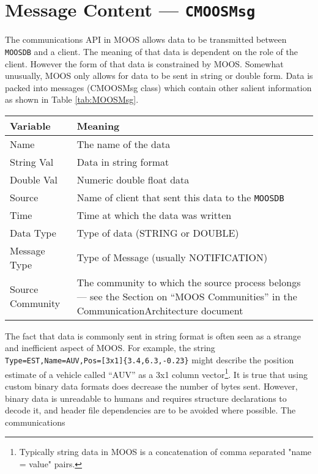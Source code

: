 \documentclass[a4paper,10pt]{article}
\newcommand{\Code}[1]{\texttt{#1} }
\newcommand{\code}[1]{\Code{#1} }
\newcommand{\DB}   {\code{{MOOSDB}}}
\begin{document}
\section{Message Content --- \code{CMOOSMsg} } \label{Sec:CMOOSMsg}
The communications API in MOOS allows data to be transmitted
between \DB and a client. The meaning of that data is dependent on
the role of the client. However the form of that data is
constrained by MOOS. Somewhat unusually, MOOS only allows for data
to be sent in string or double form. Data is packed into messages
(CMOOSMsg class) which contain other salient information as shown in
Table \ref{tab:MOOSMsg}.
\begin{table*}
\centering
\begin{tabular}{l|l}\hline
  {\textbf{Variable}} & {\textbf{Meaning}} \\ \hline
  Name  & The name of the data \\
  String Val & Data in string format \\
  Double Val & Numeric double float data \\
  Source & Name of client that sent this data to the \DB \\
  Time & Time at which the data was written \\
  Data Type & Type of data (STRING or DOUBLE)  \\
  Message Type & Type of Message (usually NOTIFICATION) \\
  Source Community & The community to which the source process
belongs --- see the Section on ``MOOS Communities'' in the CommunicationArchitecture document\\\hline
\end{tabular}\vspace{7mm}
  \caption{Contents of MOOS Message}\label{tab:MOOSMsg}
\end{table*}
The fact that data is commonly sent in string format is often seen
as a strange and inefficient aspect of MOOS. For example, the
string \verb"Type=EST,Name=AUV,Pos=[3x1]{3.4,6.3,-0.23}" might
describe the position estimate of a vehicle called ``AUV'' as a
3x1 column vector\footnote{Typically string data in MOOS is a
concatenation of comma separated "name = value" pairs.}. It is
true that using custom binary data formats does decrease the
number of bytes sent. However, binary data is unreadable to humans
and requires structure declarations to decode it, and header file
dependencies are to be avoided where possible. The communications
\end{document}
